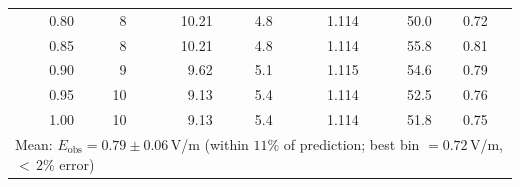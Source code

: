 \begin{table}[ht]
\begin{ruledtabular}
\begin{tabular}{rrrrrrc}
0.80 &  8 & 10.21 &  4.8 & 1.114 &  50.0 & 0.72 \\
0.85 &  8 & 10.21 &  4.8 & 1.114 &  55.8 & 0.81 \\
0.90 &  9 &  9.62 &  5.1 & 1.115 &  54.6 & 0.79 \\
0.95 & 10 &  9.13 &  5.4 & 1.114 &  52.5 & 0.76 \\
1.00 & 10 &  9.13 &  5.4 & 1.114 &  51.8 & 0.75 \\
\hline
\multicolumn{7}{l}{Mean: $E_{\mathrm{obs}} = 0.79 \pm 0.06$\,V/m
\quad (within $11\%$ of prediction; best bin $= 0.72$\,V/m, ${<}\,2\%$ error)} \\
\end{tabular}
\end{ruledtabular}
\end{table}
